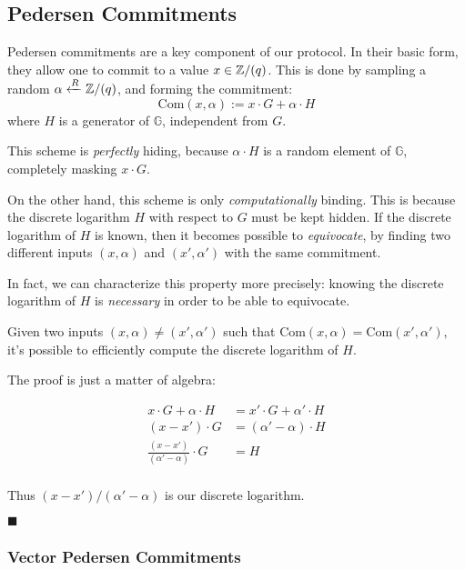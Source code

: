 \subsection{Pedersen Commitments}

Pedersen commitments \cite{pedersen_non-interactive_1992}
are a key component of our protocol.
In their basic form, they allow one to commit to a value $x \in \mathbb{Z}/(q)$. This
is done by sampling a random $\alpha \xleftarrow{R} \mathbb{Z}/(q)$, and forming the commitment:
$$
\text{Com}(x, \alpha) := x \cdot G + \alpha \cdot H
$$
where $H$ is a generator of $\mathbb{G}$, independent from $G$.

This scheme is \emph{perfectly} hiding, because $\alpha \cdot H$ is
a random element of $\mathbb{G}$, completely masking $x \cdot G$.

On the other hand, this scheme is only \emph{computationally} binding. This
is because the discrete logarithm $H$ with respect to $G$ must be kept hidden.
If the discrete logarithm of $H$ is known, then it becomes possible to
\emph{equivocate}, by finding two different inputs $(x, \alpha)$ and $(x', \alpha')$
with the same commitment.

In fact, we can characterize this property more precisely: knowing
the discrete logarithm of $H$ is \emph{necessary} in order to be able
to equivocate.

\begin{claim}
    \label{claim:ped_dlog}
    Given two inputs $(x, \alpha) \neq (x', \alpha')$ such that ${\text{Com}(x, \alpha) = \text{Com}(x', \alpha')}$,
    it's possible to efficiently compute the discrete logarithm of $H$.
\end{claim}

The proof is just a matter of algebra:

$$
\begin{aligned}
x \cdot G + \alpha \cdot H &= x' \cdot G + \alpha' \cdot H\\
(x - x') \cdot G &= (\alpha' - \alpha) \cdot H\\
\frac{(x - x')}{(\alpha' - \alpha)} \cdot G &= H\\
\end{aligned}
$$

Thus $(x - x') / (\alpha' - \alpha)$ is our discrete logarithm.

$\blacksquare$

\subsubsection{Vector Pedersen Commitments}

